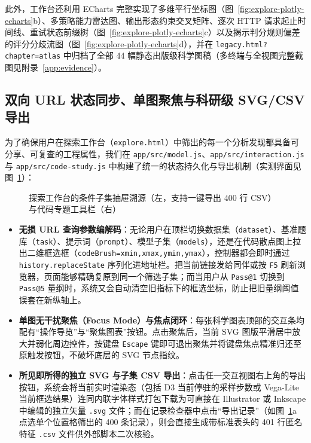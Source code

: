 此外，工作台还利用 ECharts 完整实现了多维平行坐标图（图~\ref{fig:explore-plotly-echarts}b）、多策略能力雷达图、输出形态约束交叉矩阵、逐次 HTTP 请求起止时间线、重试状态前缀树（图~\ref{fig:explore-plotly-echarts}c）以及揭示判分规则偏差的评分分歧流图（图~\ref{fig:explore-plotly-echarts}d），并在 \texttt{legacy.html?chapter=atlas} 中归档了全部 44 幅静态出版级科学图稿（多终端与全视图完整截图见附录~\ref{app:evidence}）。

\subsection{双向 URL 状态同步、单图聚焦与科研级 SVG/CSV 导出}

为了确保用户在探索工作台（\texttt{explore.html}）中筛出的每一个分析发现都具备可分享、可复查的工程属性，我们在 \texttt{app/src/model.js}、\texttt{app/src/interaction.js} 与 \texttt{app/src/code-study.js} 中构建了统一的状态持久化与导出机制（实测界面见图~\ref{fig:explore-inspector-code}）：

\begin{figure}[!htbp]
\centering
{}\hfill
{}
\caption{探索工作台的条件子集抽屉溯源（左，支持一键导出 400 行 CSV）与代码专题工具栏（右）}
\label{fig:explore-inspector-code}
\end{figure}

\begin{itemize}
  \item \textbf{无损 URL 查询参数编解码}：无论用户在顶栏切换数据集（\texttt{dataset}）、基准题库（\texttt{task}）、提示词（\texttt{prompt}）、模型子集（\texttt{models}），还是在代码散点图上拉出二维框选框（\texttt{codeBrush=xmin,xmax,ymin,ymax}），控制器都会即时通过 \texttt{history.replaceState} 序列化进地址栏。把当前链接发给同伴或按 \texttt{F5} 刷新浏览器，页面能够精确复原到同一个筛选子集；而当用户从 \texttt{Pass@1} 切换到 \texttt{Pass@5} 量纲时，系统又会自动清空旧指标下的框选坐标，防止把旧量纲阈值误套在新纵轴上。
  \item \textbf{单图无干扰聚焦（Focus Mode）与焦点闭环}：每张科学图表顶部的交互条均配有“操作导览”与“聚焦图表”按钮。点击聚焦后，当前 SVG 图版平滑居中放大并弱化周边控件，按键盘 \texttt{Escape} 键即可退出聚焦并将键盘焦点精准归还至原触发按钮，不破坏底层的 SVG 节点指纹。
  \item \textbf{所见即所得的独立 SVG 与子集 CSV 导出}：点击任一交互视图右上角的导出按钮，系统会将当前实时渲染态（包括 D3 当前停驻的采样步数或 Vega-Lite 当前框选结果）连同内联字体样式打包下载为可直接在 Illustrator 或 Inkscape 中编辑的独立矢量 \texttt{.svg} 文件；而在记录检查器中点击“导出记录”（如图~\ref{fig:explore-inspector-code}a 点选单个位置格筛出的 400 条记录），则会直接生成带标准表头的 401 行匿名特征 \texttt{.csv} 文件供外部脚本二次核验。
\end{itemize}
